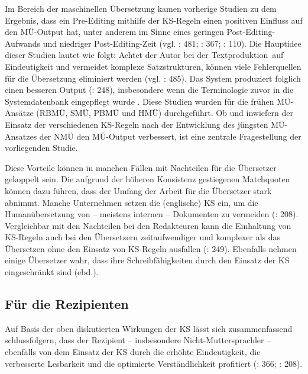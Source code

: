 Im Bereich der maschinellen Übersetzung kamen vorherige Studien zu dem Ergebnis, dass ein Pre-Editing mithilfe der KS-Regeln einen positiven Einfluss auf den MÜ-Output hat, unter anderem im Sinne eines geringen Post-Editing-Aufwands und niedriger Post-Editing-Zeit (vgl. \citealt{Göpferich2007b}: 481; \citealt{Göpferich2008}: 367; \citealt{LehrndorferReuther2008}: 110). Die Hauptidee dieser Studien lautet wie folgt: Achtet der Autor bei der Textproduktion~auf Eindeutigkeit und vermeidet komplexe Satzstrukturen, können viele Fehlerquellen für die Übersetzung eliminiert werden (vgl. \citealt{Göpferich2007b}: 485). Das System produziert folglich einen besseren Output (\citealt{NybergEtAl2003}: 248), insbesondere wenn die Terminologie zuvor in die Systemdatenbank eingepflegt wurde \citep[366]{Göpferich2008}. Diese Studien wurden für die frühen MÜ-Ansätze (RBMÜ, SMÜ, PBMÜ und HMÜ) durchgeführt. Ob und inwiefern der Einsatz der verschiedenen KS-Regeln nach der Entwicklung des jüngsten MÜ-Ansatzes der NMÜ den MÜ-Output verbessert, ist eine zentrale Fragestellung der vorliegenden Studie.

Diese Vorteile können in manchen Fällen mit Nachteilen für die Übersetzer gekoppelt sein. Die aufgrund der höheren Konsistenz gestiegenen Matchquoten können dazu führen, dass der Umfang der Arbeit für die Übersetzer stark abnimmt. Manche Unternehmen setzen die (englische) KS ein, um die Humanübersetzung von – meistens internen – Dokumenten zu vermeiden (\citealt{DrewerZiegler2014}: 208). Vergleichbar mit den Nachteilen bei den Redakteuren kann die Einhaltung von KS-Regeln auch bei den Übersetzern zeitaufwendiger und komplexer als das Übersetzen ohne den Einsatz von KS-Regeln ausfallen (\citealt{NybergEtAl2003}: 249). Ebenfalls nehmen einige Übersetzer wahr, dass ihre Schreibfähigkeiten durch den Einsatz der KS eingeschränkt sind (ebd.).

\subsection{Für die Rezipienten}



Auf Basis der oben diskutierten Wirkungen der KS lässt sich zusammenfassend schlussfolgern, dass der Rezipient -- insbesondere Nicht-Muttersprachler -- ebenfalls von dem Einsatz der KS durch die erhöhte Eindeutigkeit, die verbesserte Lesbarkeit und die optimierte Verständlichkeit profitiert (\citealt{Göpferich2008}: 366; \citealt{DrewerZiegler2014}: 208).

